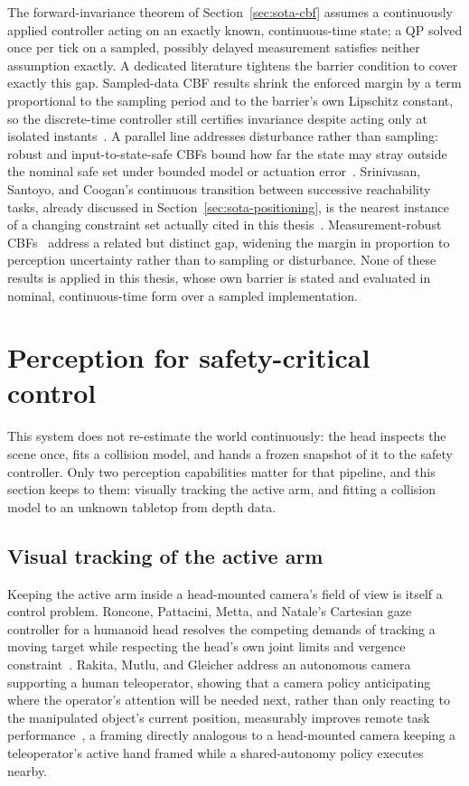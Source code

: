 The forward-invariance theorem of Section~\ref{sec:sota-cbf} assumes a continuously applied controller acting on an exactly known, continuous-time state; a QP solved once per tick on a sampled, possibly delayed measurement satisfies neither assumption exactly. A dedicated literature tightens the barrier condition to cover exactly this gap. Sampled-data CBF results shrink the enforced margin by a term proportional to the sampling period and to the barrier's own Lipschitz constant, so the discrete-time controller still certifies invariance despite acting only at isolated instants~\cite{breeden2021sampled}. A parallel line addresses disturbance rather than sampling: robust and input-to-state-safe CBFs bound how far the state may stray outside the nominal safe set under bounded model or actuation error~\cite{kolathaya2019issf}. Srinivasan, Santoyo, and Coogan's continuous transition between successive reachability tasks, already discussed in Section~\ref{sec:sota-positioning}, is the nearest instance of a changing constraint set actually cited in this thesis~\cite{srinivasan2020continuous}. \label{sec:sota-world-representation}
Measurement-robust CBFs~\cite{cosner2021mrcbf} address a related but distinct gap, widening the margin in proportion to perception uncertainty rather than to sampling or disturbance. None of these results is applied in this thesis, whose own barrier is stated and evaluated in nominal, continuous-time form over a sampled implementation.

\section{Perception for safety-critical control}
\label{sec:sota-perception}

This system does not re-estimate the world continuously: the head inspects the scene once, fits a collision model, and hands a frozen snapshot of it to the safety controller. Only two perception capabilities matter for that pipeline, and this section keeps to them: visually tracking the active arm, and fitting a collision model to an unknown tabletop from depth data.

\subsection{Visual tracking of the active arm}
\label{sec:sota-visual-servoing}

Keeping the active arm inside a head-mounted camera's field of view is itself a control problem. Roncone, Pattacini, Metta, and Natale's Cartesian gaze controller for a humanoid head resolves the competing demands of tracking a moving target while respecting the head's own joint limits and vergence constraint~\cite{roncone2016gaze}. Rakita, Mutlu, and Gleicher address an autonomous camera supporting a human teleoperator, showing that a camera policy anticipating where the operator's attention will be needed next, rather than only reacting to the manipulated object's current position, measurably improves remote task performance~\cite{rakita2018autonomouscamera}, a framing directly analogous to a head-mounted camera keeping a teleoperator's active hand framed while a shared-autonomy policy executes nearby.

